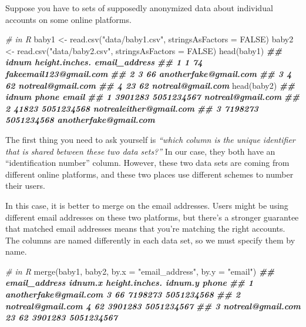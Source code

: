 \documentclass[
  12pt,
  krantz2]{krantz}
\makeatletter
\newenvironment{Shaded}{\begin{snugshade}}{\end{snugshade}}
\newcommand{\AttributeTok}[1]{\textcolor[rgb]{0.61,0.61,0.61}{#1}}
\newcommand{\CommentTok}[1]{\textcolor[rgb]{0.37,0.37,0.37}{\textit{#1}}}
\newcommand{\ConstantTok}[1]{\textcolor[rgb]{0,0,0}{#1}}
\newcommand{\DocumentationTok}[1]{\textcolor[rgb]{0.37,0.37,0.37}{\textbf{\textit{#1}}}}
\newcommand{\FunctionTok}[1]{\textcolor[rgb]{0,0,0}{#1}}
\newcommand{\NormalTok}[1]{#1}
\newcommand{\OtherTok}[1]{\textcolor[rgb]{0.37,0.37,0.37}{#1}}
\newcommand{\StringTok}[1]{\textcolor[rgb]{0.5,0.5,0.5}{#1}}
\newenvironment{kframe}{%
\medskip{}
\setlength{\fboxsep}{.8em}
 \def\at@end@of@kframe{}%
 \ifinner\ifhmode%
  \def\at@end@of@kframe{\end{minipage}}%
  \begin{minipage}{\columnwidth}%
 \fi\fi%
 \def\FrameCommand##1{\hskip\@totalleftmargin \hskip-\fboxsep
 \colorbox{shadecolor}{##1}\hskip-\fboxsep
     \hskip-\linewidth \hskip-\@totalleftmargin \hskip\columnwidth}%
 \MakeFramed {\advance\hsize-\width
   \@totalleftmargin\z@ \linewidth\hsize
   \@setminipage}}%
 {\par\unskip\endMakeFramed%
 \at@end@of@kframe}
\renewenvironment{Shaded}{\begin{kframe}}{\end{kframe}}
\makeatother
\begin{document}
Suppose you have to sets of supposedly anonymized data about individual accounts on some online platforms.

\begin{Shaded}
\begin{Highlighting}[]
\CommentTok{\# in R}
\NormalTok{baby1 }\OtherTok{\textless{}{-}} \FunctionTok{read.csv}\NormalTok{(}\StringTok{"data/baby1.csv"}\NormalTok{, }\AttributeTok{stringsAsFactors =} \ConstantTok{FALSE}\NormalTok{)}
\NormalTok{baby2 }\OtherTok{\textless{}{-}} \FunctionTok{read.csv}\NormalTok{(}\StringTok{"data/baby2.csv"}\NormalTok{, }\AttributeTok{stringsAsFactors =} \ConstantTok{FALSE}\NormalTok{)}
\FunctionTok{head}\NormalTok{(baby1)}
\DocumentationTok{\#\#   idnum height.inches.          email\_address}
\DocumentationTok{\#\# 1     1             74 fakeemail123@gmail.com}
\DocumentationTok{\#\# 2     3             66  anotherfake@gmail.com}
\DocumentationTok{\#\# 3     4             62      notreal@gmail.com}
\DocumentationTok{\#\# 4    23             62      notreal@gmail.com}
\FunctionTok{head}\NormalTok{(baby2)}
\DocumentationTok{\#\#     idnum      phone                   email}
\DocumentationTok{\#\# 1 3901283 5051234567       notreal@gmail.com}
\DocumentationTok{\#\# 2   41823 5051234568 notrealeither@gmail.com}
\DocumentationTok{\#\# 3 7198273 5051234568   anotherfake@gmail.com}
\end{Highlighting}
\end{Shaded}

The first thing you need to ask yourself is \emph{``which column is the unique identifier that is shared between these two data sets?''} In our case, they both have an ``identification number'' column. However, these two data sets are coming from different online platforms, and these two places use different schemes to number their users.

In this case, it is better to merge on the email addresses. Users might be using different email addresses on these two platforms, but there's a stronger guarantee that matched email addresses means that you're matching the right accounts. The columns are named differently in each data set, so we must specify them by name.

\begin{Shaded}
\begin{Highlighting}[]
\CommentTok{\# in R}
\FunctionTok{merge}\NormalTok{(baby1, baby2, }\AttributeTok{by.x =} \StringTok{"email\_address"}\NormalTok{, }\AttributeTok{by.y =} \StringTok{"email"}\NormalTok{)}
\DocumentationTok{\#\#           email\_address idnum.x height.inches. idnum.y      phone}
\DocumentationTok{\#\# 1 anotherfake@gmail.com       3             66 7198273 5051234568}
\DocumentationTok{\#\# 2     notreal@gmail.com       4             62 3901283 5051234567}
\DocumentationTok{\#\# 3     notreal@gmail.com      23             62 3901283 5051234567}
\end{Highlighting}
\end{Shaded}
\end{document}
